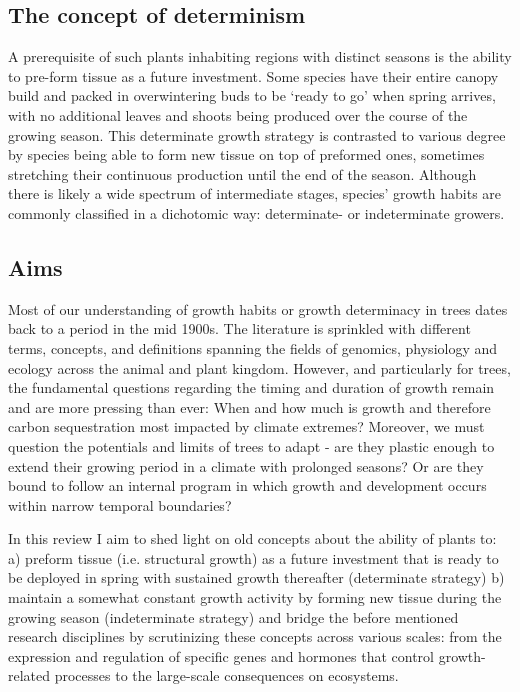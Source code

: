 \documentclass{article}
\begin{document}
	\subsection*{The concept of determinism}
	A prerequisite of such plants inhabiting regions with distinct seasons is the ability to pre-form tissue as a future investment. Some species have their entire canopy build and packed in overwintering buds to be ‘ready to go’ when spring arrives, with no additional leaves and shoots being produced over the course of the growing season. This determinate growth strategy is contrasted to various degree by species being able to form new tissue on top of preformed ones, sometimes stretching their continuous production until the end of the season. Although there is likely a wide spectrum of intermediate stages, species’ growth habits are commonly classified in a dichotomic way: determinate- or indeterminate growers.

	
	\subsection*{Aims}
	Most of our understanding of growth habits or growth determinacy in trees dates back to a period in the mid 1900s. The literature is sprinkled with different terms, concepts, and definitions spanning the fields of genomics, physiology and ecology across the animal and plant kingdom. However, and particularly for trees, the fundamental questions regarding the timing and duration of growth remain and are more pressing than ever: When and how much is growth and therefore carbon sequestration most impacted by climate extremes? Moreover, we must question the potentials and limits of trees to adapt - are they plastic enough to extend their growing period in a climate with prolonged seasons? Or are they bound to follow an internal program in which growth and development occurs within narrow temporal boundaries?
	
	In this review I aim to shed light on old concepts about the ability of plants to:
	a) preform tissue (i.e. structural growth) as a future investment that is ready to be deployed in spring with sustained growth thereafter (determinate strategy)
	b) maintain a somewhat constant growth activity by forming new tissue during the growing season (indeterminate strategy)
	and bridge the before mentioned research disciplines by scrutinizing these concepts across various scales: from the expression and regulation of specific genes and hormones that control growth-related processes to the large-scale consequences on ecosystems. 
	\\
\end{document}
